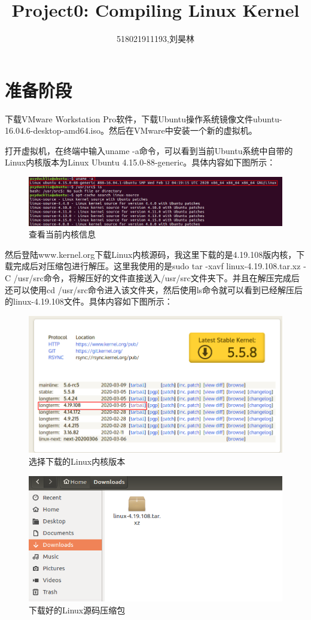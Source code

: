 \documentclass[11pt,a4paper]{article}
\title{\textbf{Project0: Compiling Linux Kernel}} %
\author{518021911193,刘昊林} %
\date{} %
\begin{document}
	\maketitle %
	
	\section{准备阶段}
	下载VMware Workstation Pro软件，下载Ubuntu操作系统镜像文件ubuntu-16.04.6-desktop-amd64.iso。然后在VMware中安装一个新的虚拟机。\par
	打开虚拟机，在终端中输入uname -a命令，可以看到当前Ubuntu系统中自带的Linux内核版本为Linux Ubuntu 4.15.0-88-generic。具体内容如下图所示：
	\begin{figure}[h]
		\centering
		\includegraphics[width=0.7\linewidth]{Pictures/1_WPS}
		\caption{查看当前内核信息}
		\label{fig:1wps}
	\end{figure} \par
	然后登陆www.kernel.org下载Linux内核源码，我这里下载的是4.19.108版内核，下载完成后对压缩包进行解压。这里我使用的是sudo tar -xavf linux-4.19.108.tar.xz -C /usr/src命令，将解压好的文件直接送入/usr/src文件夹下。并且在解压完成后还可以使用cd /usr/src命令进入该文件夹，然后使用ls命令就可以看到已经解压后的linux-4.19.108文件。具体内容如下图所示：
	\begin{figure}[h]
		\centering
		\includegraphics[width=0.7\linewidth]{Pictures/3_WPS}
		\caption{选择下载的Linux内核版本}
		\label{fig:3wps}
	\end{figure}
	\newpage
	\begin{figure}[h]
		\centering
		\includegraphics[width=0.7\linewidth]{Pictures/2}
		\caption{下载好的Linux源码压缩包}
		\label{fig:2}
	\end{figure}
\end{document}
